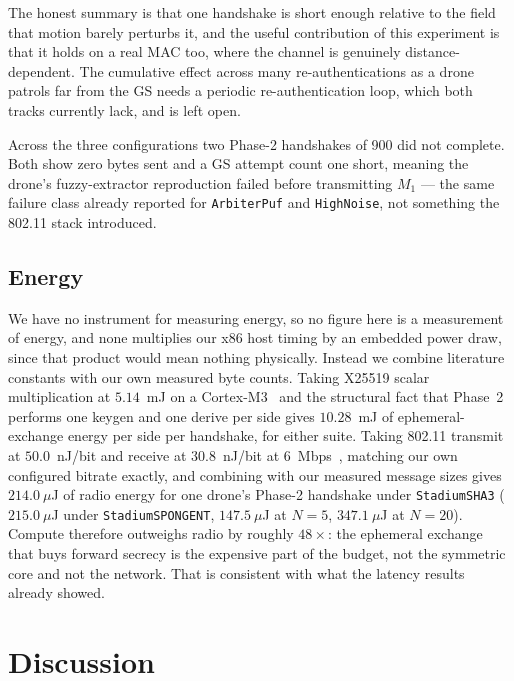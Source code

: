 \documentclass[conference]{IEEEtran}
\begin{document}
The honest summary is that one handshake is short enough relative to the field
that motion barely perturbs it, and the useful contribution of this experiment is
that it holds on a real MAC too, where the channel is genuinely
distance-dependent. The cumulative effect across many re-authentications as a
drone patrols far from the GS needs a periodic re-authentication loop, which both
tracks currently lack, and is left open.

Across the three configurations two Phase-2 handshakes of 900 did not complete.
Both show zero bytes sent and a GS attempt count one short, meaning the drone's
fuzzy-extractor reproduction failed before transmitting $M_1$ --- the same
failure class already reported for \texttt{ArbiterPuf} and \texttt{HighNoise},
not something the 802.11 stack introduced.

\subsection{Energy}

We have no instrument for measuring energy, so no figure here is a measurement
of energy, and none multiplies our x86 host timing by an embedded power draw,
since that product would mean nothing physically. Instead we combine literature
constants with our own measured byte counts. Taking X25519 scalar multiplication
at $5.14$~mJ on a Cortex-M3~\cite{x25519_energy_franck} and the structural fact
that Phase~2 performs one keygen and one derive per side gives $10.28$~mJ of
ephemeral-exchange energy per side per handshake, for either suite. Taking
802.11 transmit at $50.0$~nJ/bit and receive at $30.8$~nJ/bit at
6~Mbps~\cite{radio_energy_ergen}, matching our own configured bitrate exactly,
and combining with our measured message sizes gives $214.0~\mu$J of radio energy
for one drone's Phase-2 handshake under \texttt{StadiumSHA3} ($215.0~\mu$J under
\texttt{StadiumSPONGENT}, $147.5~\mu$J at $N=5$, $347.1~\mu$J at $N=20$).
Compute therefore outweighs radio by roughly $48\times$: the ephemeral exchange
that buys forward secrecy is the expensive part of the budget, not the symmetric
core and not the network. That is consistent with what the latency results
already showed.

\section{Discussion}
\end{document}
